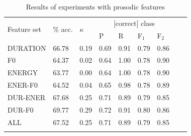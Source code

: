 		\begin{table}
			\centering
			\caption{Results of experiments with prosodic features  }
			\begin{tabularx}{\textwidth}{lXXXXXXXX}			
			
			\toprule
			\multirow{2}{*}{Feature set} & \multirow{2}{*}{\% acc.} & \multirow{2}{*}{$\kappa$} & \multicolumn{4}{c}{[correct] class} \\
			 \cmidrule(lr){4-7}
			& & & P & R & F$_1$ & F$_2$ \\
			\midrule
		
DURATION	&	66.78	&	0.19	&	0.69	&	0.91	&	0.79	&	0.86	\\
F0	&	64.37	&	0.02	&	0.64	&	1.00	&	0.78	&	0.90	\\
ENERGY	&	63.77	&	0.00	&	0.64	&	1.00	&	0.78	&	0.90	\\
\addlinespace											
ENER-F0	&	64.52	&	0.04	&	0.65	&	0.98	&	0.78	&	0.89	\\
DUR-ENER	&	67.68	&	0.25	&	0.71	&	0.89	&	0.79	&	0.85	\\
DUR-F0	&	69.77	&	0.29	&	0.72	&	0.91	&	0.80	&	0.86	\\
\addlinespace											
ALL	&	67.52	&	0.25	&	0.71	&	0.89	&	0.79	&	0.85	\\		
			\bottomrule
			\label{tab:results:prosody}
			\end{tabularx}
		\end{table}
		
		
		

